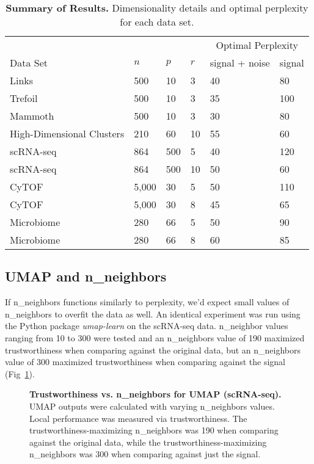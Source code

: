 \documentclass[10pt,letterpaper]{article}
\begin{document}
\begin{table}[!ht]
\centering
\caption{{\bf Summary of Results.}
Dimensionality details and optimal perplexity for each data set.}
\begin{tabular}{@{}llllll@{}}
\toprule 
 & & & & \multicolumn{2}{c}{Optimal Perplexity} \\
\cmidrule{5-6}
Data Set & $n$ & $p$ & $r$ & signal + noise & signal \\
\midrule 
Links \cite{Distill} & 500 & 10 & 3 & 40 & 80 \\
Trefoil \cite{Distill} & 500 & 10 & 3 & 35 & 100 \\
Mammoth \cite{understanding DR} & 500 & 10 & 3 & 30 & 80 \\
High-Dimensional Clusters & 210 & 60 & 10 & 55 & 60 \\
scRNA-seq \cite{scRNA data} & 864 & 500 & 5 & 40 & 120 \\
scRNA-seq \cite{scRNA data} & 864 & 500 & 10 & 50 & 60 \\
CyTOF \cite{CyTOF data} & 5,000 & 30 & 5 & 50 & 110 \\
CyTOF \cite{CyTOF data} & 5,000 & 30 & 8 & 45 & 65 \\
Microbiome \cite{enterotype data} & 280 & 66 & 5 & 50 & 90 \\
Microbiome \cite{enterotype data} & 280 & 66 & 8 & 60 & 85 \\
\bottomrule
\end{tabular}
\end{table}

\subsection*{UMAP and n\_neighbors}
If n\_neighbors functions similarly to perplexity, we'd expect small values of n\_neighbors to overfit the data as well. An identical experiment was run using the Python package \textit{umap-learn} \cite{umap} on the scRNA-seq data. n\_neighbor values ranging from 10 to 300 were tested and an n\_neighbors value of 190 maximized trustworthiness when comparing against the original data, but an n\_neighbors value of 300 maximized trustworthiness when comparing against the signal (Fig~\ref{fig14}).

\begin{figure}[!h]
\caption{{\bf Trustworthiness vs. n\_neighbors for UMAP (scRNA-seq).}
UMAP outputs were calculated with varying n\_neighbors values. Local performance was measured via trustworthiness. The trustworthiness-maximizing n\_neighbors was 190 when comparing against the original data, while the trustworthiness-maximizing n\_neighbors was 300 when comparing against just the signal.}
\label{fig14}
\end{figure}
\end{document}
